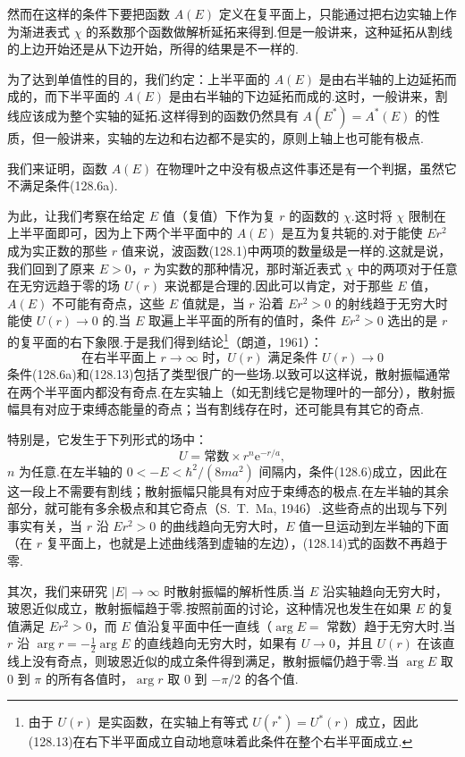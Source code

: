 然而在这样的条件下要把函数 $A(E)$ 定义在复平面上，只能通过把右边实轴上作为渐进表式 $\chi$ 的系数那个函数做解析延拓来得到.但是一般讲来，这种延拓从割线的上边开始还是从下边开始，所得的结果是不一样的.

为了达到单值性的目的，我们约定：上半平面的 $A(E)$ 是由右半轴的上边延拓而成的，而下半平面的 $A(E)$ 是由右半轴的下边延拓而成的.这时，一般讲来，割线应该成为整个实轴的延拓.这样得到的函数仍然具有 $A(E^{*})=A^{*}(E)$ 的性质，但一般讲来，实轴的左边和右边都不是实的，原则上轴上也可能有极点.

我们来证明，函数 $A(E)$ 在物理叶之中没有极点这件事还是有一个判据，虽然它不满足条件(128.6a).

为此，让我们考察在给定 $E$ 值（复值）下作为复 $r$ 的函数的 $\chi$.这时将 $\chi$ 限制在上半平面即可，因为上下两个半平面中的 $A(E)$ 是互为复共轭的.对于能使 $Er^2$ 成为实正数的那些 $r$ 值来说，波函数(128.1)中两项的数量级是一样的.这就是说，我们回到了原来 $E>0$，$r$ 为实数的那种情况，那时渐近表式 $\chi$ 中的两项对于任意在无穷远趋于零的场 $U(r)$ 来说都是合理的.因此可以肯定，对于那些 $E$ 值，$A(E)$ 不可能有奇点，这些 $E$ 值就是，当 $r$ 沿着 $Er^2>0$ 的射线趋于无穷大时能使 $U(r)\to0$ 的.当 $E$ 取遍上半平面的所有的值时，条件 $Er^2>0$ 选出的是 $r$ 的复平面的右下象限.于是我们得到结论\footnote{由于 $U(r)$ 是实函数，在实轴上有等式 $U(r^*)=U^*(r)$ 成立，因此(128.13)在右下半平面成立自动地意味着此条件在整个右半平面成立.}（朗道，1961）：
\begin{equation}
  \text{在右半平面上 }r\to\infty\text{ 时，}U(r)\text{ 满足条件 }U(r)\to0
\end{equation}
条件(128.6a)和(128.13)包括了类型很广的一些场.以致可以这样说，散射振幅通常在两个半平面内都没有奇点.在左实轴上（如无割线它是物理叶的一部分），散射振幅具有对应于束缚态能量的奇点；当有割线存在时，还可能具有其它的奇点.

特别是，它发生于下列形式的场中：
\begin{equation}
  U=\text{常数}\times r^n\mathrm{e}^{-r/a},
\end{equation}
$n$ 为任意.在左半轴的 $0<-E<\hbar^2/(8ma^2)$ 间隔内，条件(128.6)成立，因此在这一段上不需要有割线；散射振幅只能具有对应于束缚态的极点.在左半轴的其余部分，就可能有多余极点和其它奇点（S.~T.~Ma, 1946）.这些奇点的出现与下列事实有关，当 $r$ 沿 $Er^2>0$ 的曲线趋向无穷大时，$E$ 值一旦运动到左半轴的下面（在 $r$ 复平面上，也就是上述曲线落到虚轴的左边），(128.14)式的函数不再趋于零.

其次，我们来研究 $|E|\to\infty$ 时散射振幅的解析性质.当 $E$ 沿实轴趋向无穷大时，玻恩近似成立，散射振幅趋于零.按照前面的讨论，这种情况也发生在如果 $E$ 的复值满足 $Er^2>0$，而 $E$ 值沿复平面中任一直线（$\arg E=$ 常数）趋于无穷大时.当 $r$ 沿 $\arg r=-\frac{1}{2}\arg E$ 的直线趋向无穷大时，如果有 $U\to0$，并且 $U(r)$ 在该直线上没有奇点，则玻恩近似的成立条件得到满足，散射振幅仍趋于零.当 $\arg E$ 取 0 到 $\pi$ 的所有各值时，$\arg r$ 取 0 到 $-\pi/2$ 的各个值.

